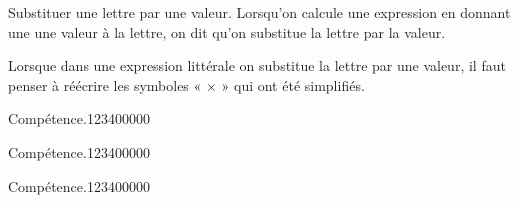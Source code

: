 \begin{pageCours}
\begin{DefT}{Substituer une lettre par une valeur.}
Lorsqu'on calcule une expression en donnant une une valeur à la lettre,  on dit qu'on substitue la lettre par la valeur.
\end{DefT}

\begin{Rq}
Lorsque dans une expression littérale on substitue la lettre par une valeur, il faut penser à réécrire les symboles « $\times$ » qui ont été simplifiés.
\end{Rq}

\end{pageCours} %


\begin{pageAD}  %
\restoregeometry %


\begin{ExoCad}{Compétence.}{1234}{0}{0}{0}{0}{0}

\end{ExoCad}


\begin{ExoCad}{Compétence.}{1234}{0}{0}{0}{0}{0}

\end{ExoCad}


\begin{ExoCad}{Compétence.}{1234}{0}{0}{0}{0}{0}

\end{ExoCad}
 
\end{pageAD} %



